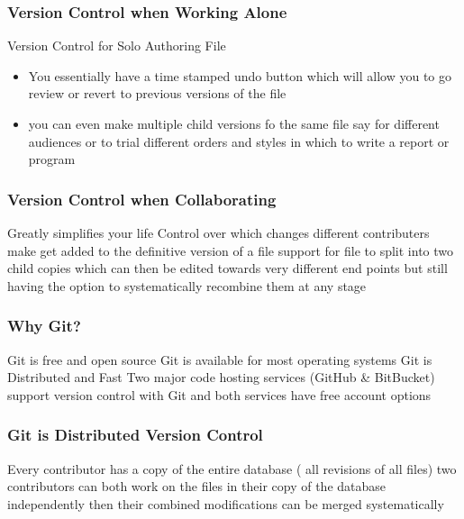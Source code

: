 \documentclass[xcolor=dvipsnames]{beamer}
\begin{document}
\begin{frame}
\frametitle{Version Control when Working Alone}
\begin{block}{Version Control for Solo Authoring File}
\begin{itemize}
\item You essentially have a time stamped undo button which will allow you to go review or revert to previous versions of the file
\item you can even make multiple child versions fo the same file say for different audiences or to trial different orders and styles in which to write a report or program
\end{itemize}
\end{block}

\end{frame}


\begin{frame}
\frametitle{Version Control when Collaborating}
Greatly simplifies your life
Control over which changes different contributers make get added to the definitive version of a file
support for file to split into two child copies which can then be edited towards very different end points but still having the option to systematically recombine them at any stage

\end{frame}






\begin{frame}
\frametitle{Why Git?}

Git is free and open source
\newline
\newline
Git is available for most operating systems
\newline
\newline
Git is Distributed and Fast
\newline
\newline
Two major code hosting services (GitHub \& BitBucket) support version control with Git and both services have free account options


\end{frame}



\begin{frame} 
\frametitle{Git is Distributed Version Control}
Every contributor has a copy of the entire database ( all revisions of all files)
two contributors can both work on the files in their copy of the database independently then their combined modifications can be merged systematically
\end{frame} 
\end{document}
